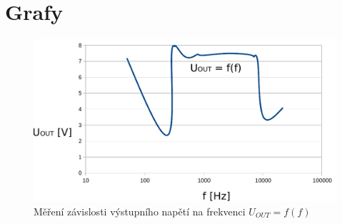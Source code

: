 \section*{Grafy}
\setcounter{figure}{0}
\renewcommand{\figurename}{Graf č.}
  
  \begin{figure}[H]
    \centering
    \includegraphics[width=16cm]{../img/201_graf.pdf}
    \caption{Měření závislosti výstupního napětí na frekvenci $U_{OUT} = f(f)$}
    \label{gra:1}
  \end{figure}

 
